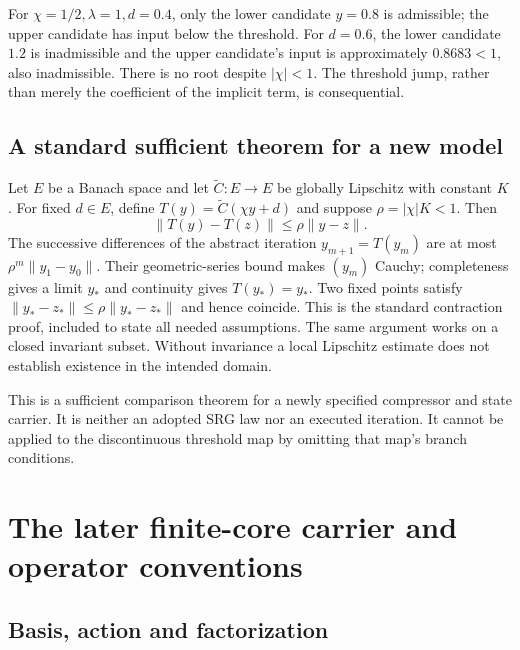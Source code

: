\documentclass[11pt,a4paper]{article}
\theoremstyle{definition}
\numberwithin{equation}{section}
\begin{document}
For $\chi=1/2,\lambda=1,d=0.4$, only the lower candidate $y=0.8$
is admissible; the upper candidate has input below the threshold.
For $d=0.6$, the lower candidate $1.2$ is inadmissible and the
upper candidate's input is approximately $0.8683<1$, also inadmissible.
There is no root despite $|\chi|<1$. The threshold jump, rather than
merely the coefficient of the implicit term, is consequential.

\subsection{A standard sufficient theorem for a new model}
\label{app:new-model}

Let $E$ be a Banach space and let $\widetilde C:E\to E$ be globally
Lipschitz with constant $K$. For fixed $d\in E$, define
$T(y)=\widetilde C(\chi y+d)$ and suppose $\rho=|\chi|K<1$.
Then
\[
 \|T(y)-T(z)\|\leq\rho\|y-z\|.
\]
The successive differences of the abstract iteration $y_{m+1}=T(y_m)$
are at most $\rho^m\|y_1-y_0\|$. Their geometric-series bound makes
$(y_m)$ Cauchy; completeness gives a limit $y_*$ and continuity gives
$T(y_*)=y_*$. Two fixed points satisfy
$\|y_*-z_*\|\leq\rho\|y_*-z_*\|$ and hence coincide.
This is the standard contraction proof, included to state all needed
assumptions. The same argument works on a closed invariant subset.
Without invariance a local Lipschitz estimate does not establish existence
in the intended domain.

This is a sufficient comparison theorem for a newly specified compressor
and state carrier. It is neither an adopted SRG law nor an executed
iteration. It cannot be applied to the discontinuous threshold map by
omitting that map's branch conditions.


\section{The later finite-core carrier and operator conventions}
\label{app:finite}

\subsection{Basis, action and factorization}
\end{document}

